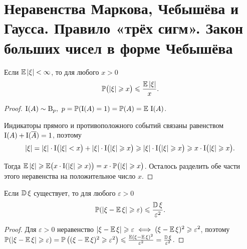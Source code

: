 \section{Неравенства Маркова, Чебышёва и Гаусса. Правило «трёх сигм». Закон больших чисел в форме Чебышёва}
\begin{namedthm}
    Если $\operatorname{\mathbb{E}} |\xi| < \infty$, то для любого $x > 0$
    \begin{equation*}
        \operatorname{\mathbb{P}}\bigl( |\xi| \geqslant x \bigr) \leqslant \frac{\operatorname{\mathbb{E}} |\xi|}{x}.
    \end{equation*}
\end{namedthm}

\begin{proof} $\operatorname{\mathrm{I}}(A) \sim \operatorname{\mathrm{B}}_{p},~ p = \operatorname{\mathbb{P}}(\operatorname{\mathrm{I}}(A) = 1) = \operatorname{\mathbb{P}}(A) = \operatorname{\mathbb{E}} \,\operatorname{\mathrm{I}}(A)$.
    
    Индикаторы прямого и противоположного событий связаны равенством $\operatorname{\mathrm{I}}(A) + \operatorname{\mathrm{I}}(\overline{A}) = 1$, поэтому
    \begin{equation*}
        |\xi|=|\xi| \cdot \operatorname{\mathrm{I}}\bigl(|\xi|<x\bigr) + |\xi| \cdot \operatorname{\mathrm{I}}\bigl(|\xi| \geqslant x \bigr) \geqslant
        |\xi| \cdot \operatorname{\mathrm{I}}\bigl( |\xi| \geqslant x \bigr) \geqslant 
        x \cdot \operatorname{\mathrm{I}}\bigl(|\xi| \geqslant x \bigr).
    \end{equation*}
    
    Тогда $\operatorname{\mathbb{E}} |\xi| \geqslant \operatorname{\mathbb{E}} \bigl(x \cdot \operatorname{\mathrm{I}}(|\xi| \geqslant x) \bigr) = x \cdot \operatorname{\mathbb{P}} \bigl( |\xi| \geqslant x \bigr)$. 
    Осталось разделить обе части этого неравенства на положительное число $x$.
\end{proof}

\begin{namedthm}
    Если $\operatorname{\mathbb{D}}\xi$ существует, то для любого $\varepsilon > 0$
    \begin{equation*}
        \operatorname{\mathbb{P}}(|\xi-\operatorname{\mathbb{E}} \xi| \geqslant \varepsilon) \leqslant \frac{\operatorname{\mathbb{D}} \xi}{\varepsilon^{2}}.
    \end{equation*}
\end{namedthm}

\begin{proof}
    Для $\varepsilon > 0$ неравенство $|\xi - \operatorname{\mathbb{E}} \xi| \geqslant \varepsilon \iff (\xi - \operatorname{\mathbb{E}} \xi)^2 \geqslant \varepsilon^2$, поэтому $\operatorname{\mathbb{P}}(|\xi-\operatorname{\mathbb{E}} \xi| \geqslant \varepsilon) = 
        \operatorname{\mathbb{P}}\left((\xi-\operatorname{\mathbb{E}} \xi)^{2} \geqslant \varepsilon^{2}\right) \leqslant 
        \frac{\operatorname{\mathbb{E}} (\xi-\operatorname{\mathbb{E}} \xi)^{2}}{\varepsilon^{2}} =
        \frac{\operatorname{\mathbb{D}} \xi}{\varepsilon^{2}}$.
\end{proof}

